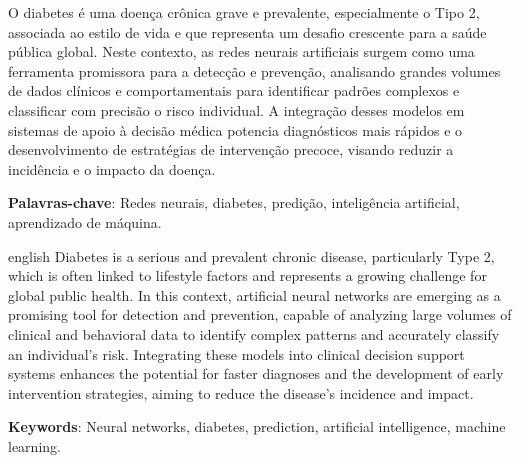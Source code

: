
\setlength{\absparsep}{18pt} %
\begin{resumo}
	O diabetes é uma doença crônica grave e prevalente, especialmente o Tipo 2, associada ao estilo de vida e que representa um desafio crescente para a saúde pública global. Neste contexto, as redes neurais artificiais surgem como uma ferramenta promissora para a detecção e prevenção, analisando grandes volumes de dados clínicos e comportamentais para identificar padrões complexos e classificar com precisão o risco individual. A integração desses modelos em sistemas de apoio à decisão médica potencia diagnósticos mais rápidos e o desenvolvimento de estratégias de intervenção precoce, visando reduzir a incidência e o impacto da doença.
	
	\textbf{Palavras-chave}: Redes neurais, diabetes, predição, inteligência artificial, aprendizado de máquina.
\end{resumo}

\begin{resumo}[Abstract]
	\begin{otherlanguage*}{english}
		Diabetes is a serious and prevalent chronic disease, particularly Type 2, which is often linked to lifestyle factors and represents a growing challenge for global public health. In this context, artificial neural networks are emerging as a promising tool for detection and prevention, capable of analyzing large volumes of clinical and behavioral data to identify complex patterns and accurately classify an individual's risk. Integrating these models into clinical decision support systems enhances the potential for faster diagnoses and the development of early intervention strategies, aiming to reduce the disease's incidence and impact.
		
		\vspace{\onelineskip}
		
		\noindent 
		\textbf{Keywords}: Neural networks, diabetes, prediction, artificial intelligence, machine learning.

	\end{otherlanguage*}
\end{resumo}
